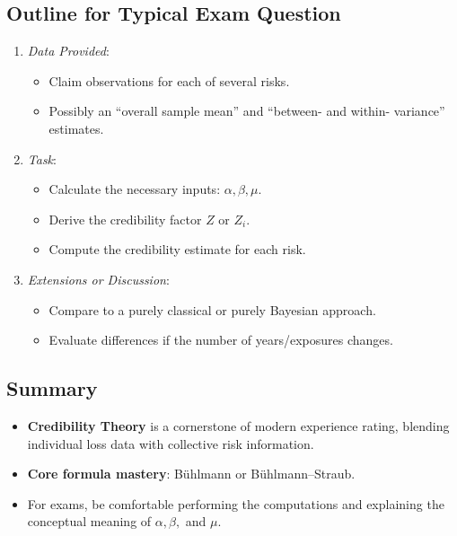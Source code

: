 \documentclass[13pt,a4paper]{article}
\begin{document}
\subsection{Outline for Typical Exam Question}
\begin{enumerate}
  \item \emph{Data Provided}: 
    \begin{itemize}
      \item Claim observations for each of several risks.
      \item Possibly an “overall sample mean” and “between- and within- variance” estimates.
    \end{itemize}
  \item \emph{Task}: 
    \begin{itemize}
      \item Calculate the necessary inputs: \(\alpha, \beta, \mu\).
      \item Derive the credibility factor \(Z\) or \(Z_i\).
      \item Compute the credibility estimate for each risk.
    \end{itemize}
  \item \emph{Extensions or Discussion}:
    \begin{itemize}
      \item Compare to a purely classical or purely Bayesian approach.
      \item Evaluate differences if the number of years/exposures changes.
    \end{itemize}
\end{enumerate}

\subsection{Summary}
\begin{itemize}
  \item \textbf{Credibility Theory} is a cornerstone of modern experience rating, blending individual loss data with collective risk information.
  \item \textbf{Core formula mastery}: B\"{u}hlmann or B\"{u}hlmann--Straub. 
  \item For exams, be comfortable performing the computations and explaining the conceptual meaning of \(\alpha, \beta,\) and \(\mu\).
\end{itemize}
\end{document}
